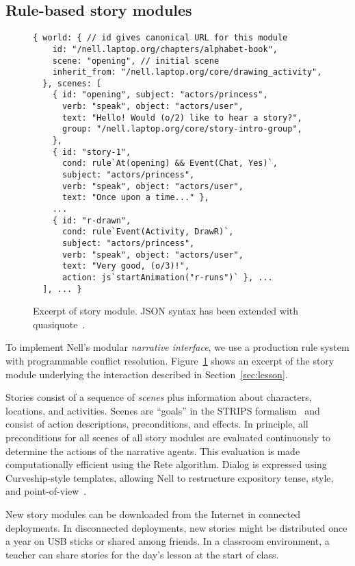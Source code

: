 \documentclass[preprint]{sig-alternate}
\begin{document}
\subsection{Rule-based story modules}
\begin{figure}\small
\begin{verbatim}
{ world: { // id gives canonical URL for this module
    id: "/nell.laptop.org/chapters/alphabet-book",
    scene: "opening", // initial scene
    inherit_from: "/nell.laptop.org/core/drawing_activity",
  }, scenes: [
    { id: "opening", subject: "actors/princess",
      verb: "speak", object: "actors/user",
      text: "Hello! Would (o/2) like to hear a story?",
      group: "/nell.laptop.org/core/story-intro-group",
    },
    { id: "story-1",
      cond: rule`At(opening) && Event(Chat, Yes)`,
      subject: "actors/princess",
      verb: "speak", object: "actors/user",
      text: "Once upon a time..." },
    ...
    { id: "r-drawn",
      cond: rule`Event(Activity, DrawR)`,
      subject: "actors/princess",
      verb: "speak", object: "actors/user",
      text: "Very good, (o/3)!",
      action: js`startAnimation("r-runs")` }, ...
  ], ... }
\end{verbatim}
\caption{Excerpt of story module.  JSON syntax has been extended with
quasiquote~\cite{quasiquote}.}\label{fig:rules}
\end{figure}
To implement Nell's modular \textit{narrative interface}, we use a
production rule system with programmable conflict resolution.
Figure~\ref{fig:rules} shows
an excerpt of the story module underlying the interaction described in
Section~\ref{sec:lesson}.

Stories consist of a sequence of \textit{scenes} plus information about
characters, locations, and activities.  Scenes are ``goals''
in the STRIPS formalism~\cite{strips} and consist of
action descriptions, preconditions, and effects.
In principle, all preconditions for all scenes of all story modules
are evaluated continuously to determine the actions of the narrative
agents.  This evaluation
is made computationally efficient using the Rete
algorithm.  Dialog is expressed using Curveship-style
templates, allowing Nell to restructure
expository tense, style, and point-of-view~\cite{montfort:curveship}.


New story modules can be downloaded from the Internet in
connected deployments.  In disconnected deployments, new stories
might be distributed once a year on USB sticks or shared among
friends.  In a classroom environment, a teacher can share stories for
the day's lesson at the start of class.
\end{document}
